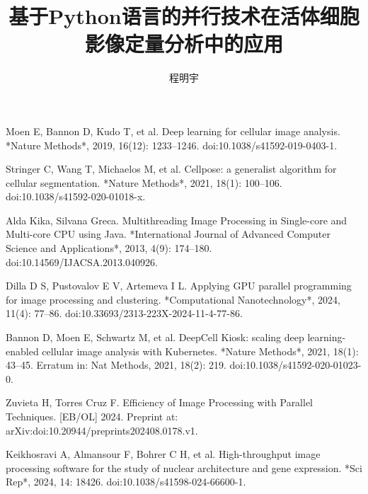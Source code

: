 \documentclass[UTF8,zihao=-4]{oucart}
\title{基于Python语言的并行技术在活体细胞影像定量分析中的应用}
\author{程明宇}
\begin{document}
    \makecover %
    \makesignature %
    \makeabstract %

    \thispagestyle{tableofcontents}
    \tableofcontents
    \newpage

    \setcounter{page}{1}


    
    \newpage
    
    \newpage
    
    \newpage
    
    \newpage
    \begin{thebibliography}{99}
        Moen E, Bannon D, Kudo T, et al. Deep learning for cellular image analysis. *Nature Methods*, 2019, 16(12): 1233--1246. doi:10.1038/s41592-019-0403-1.
        
        Stringer C, Wang T, Michaelos M, et al. Cellpose: a generalist algorithm for cellular segmentation. *Nature Methods*, 2021, 18(1): 100--106. doi:10.1038/s41592-020-01018-x.
        
        Alda Kika, Silvana Greca. Multithreading Image Processing in Single-core and Multi-core CPU using Java. *International Journal of Advanced Computer Science and Applications*, 2013, 4(9): 174--180. doi:10.14569/IJACSA.2013.040926.
        
        Dilla D S, Pustovalov E V, Artemeva I L. Applying GPU parallel programming for image processing and clustering. *Computational Nanotechnology*, 2024, 11(4): 77--86. doi:10.33693/2313-223X-2024-11-4-77-86.
        
        Bannon D, Moen E, Schwartz M, et al. DeepCell Kiosk: scaling deep learning-enabled cellular image analysis with Kubernetes. *Nature Methods*, 2021, 18(1): 43--45. Erratum in: Nat Methods, 2021, 18(2): 219. doi:10.1038/s41592-020-01023-0.
        
        Zuvieta H, Torres Cruz F. Efficiency of Image Processing with Parallel Techniques. [EB/OL] 2024. Preprint at: arXiv:doi:10.20944/preprints202408.0178.v1.
        
        Keikhosravi A, Almansour F, Bohrer C H, et al. High-throughput image processing software for the study of nuclear architecture and gene expression. *Sci Rep*, 2024, 14: 18426. doi:10.1038/s41598-024-66600-1.
        

\end{thebibliography}
\end{document}
